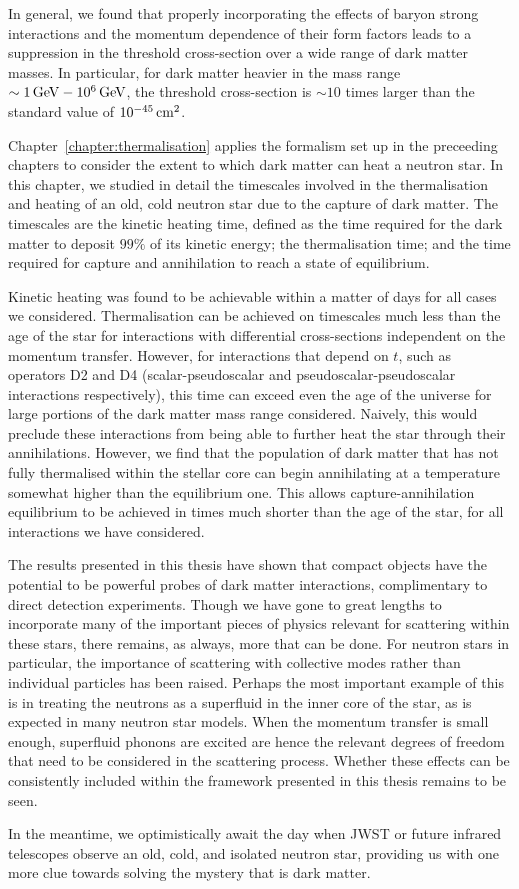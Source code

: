 In general, we found that properly incorporating the effects of baryon strong interactions and the momentum dependence of their form factors leads to a suppression in the threshold cross-section over a wide range of dark matter masses. In particular, for dark matter heavier in the mass range $\sim 1{\rm \,GeV}-10^6{\rm \,GeV}$, the threshold cross-section is $\sim 10$ times larger than the standard value of $10^{-45}{\rm \,cm}^2$. 

Chapter~\ref{chapter:thermalisation} applies the formalism set up in the preceeding chapters to consider the extent to which dark matter can heat a neutron star. In this chapter, we studied in detail the timescales involved in the thermalisation and heating of an old, cold neutron star due to the capture of dark matter. The timescales are the kinetic heating time, defined as the time required for the dark matter to deposit $99\%$ of its kinetic energy; the thermalisation time; and the time required for capture and annihilation to reach a state of equilibrium. 

Kinetic heating was found to be achievable within a matter of days for all cases we considered. Thermalisation can be achieved on timescales much less than the age of the star for interactions with differential cross-sections independent on the momentum transfer. However, for interactions that depend on $t$, such as operators D2 and D4 (scalar-pseudoscalar and pseudoscalar-pseudoscalar interactions respectively), this time can exceed even the age of the universe for large portions of the dark matter mass range considered. Naively, this would preclude these interactions from being able to further heat the star through their annihilations. 
However, we find that the population of dark matter that has not fully thermalised within the stellar core can begin annihilating at a temperature somewhat higher than the equilibrium one. This allows capture-annihilation equilibrium to be achieved in times much shorter than the age of the star, for all interactions we have considered. 

The results presented in this thesis have shown that compact objects have the potential to be powerful probes of dark matter interactions, complimentary to direct detection experiments. Though we have gone to great lengths to incorporate many of the important pieces of physics relevant for scattering within these stars, there remains, as always, more that can be done. For neutron stars in particular, the importance of scattering with collective modes rather than individual particles has been raised. Perhaps the most important example of this is in treating the neutrons as a superfluid in the inner core of the star, as is expected in many neutron star models. When the momentum transfer is small enough, superfluid phonons are excited are hence the relevant degrees of freedom that need to be considered in the scattering process. Whether these effects can be consistently included within the framework presented in this thesis remains to be seen. 

In the meantime, we optimistically await the day when JWST or future infrared telescopes observe an old, cold, and isolated neutron star, providing us with one more clue towards solving the mystery that is dark matter.